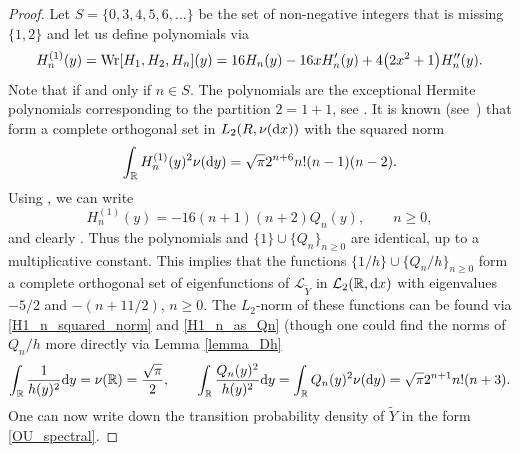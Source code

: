 \documentclass[pdftex]{sigma}
\numberwithin{equation}{section}
\theoremstyle{definition}
\def\L{{\mathcal L}}
\def\r{{\mathbb R}}
\def\wr{{\textnormal{Wr}}}
\def\d{{\textnormal d}}
\begin{document}
\begin{proof}
Let $S=\{0,3,4,5,6,\dots\}$ be the set of non-negative integers that is missing $\{1,2\}$ and let us define polynomials  via
\[
H^{(1)}_n(y)=\wr[H_1,H_2,H_n](y)=16 H_n(y)-16 x H_n'(y)+4 \bigl(2x^2+1\bigr) H_n''(y).
\]
Note that  if and only if $n\in S$.
The polynomials  are the exceptional Hermite polynomials corresponding to the partition $2=1+1$, see \cite[Definition 5.1]{Ullate_2014}. It is known (see~\cite[Propositions 5.7 and 5.8]{Ullate_2014}) that  form a complete orthogonal set in $L_2(R,\nu(\d x))$ with the squared norm
\begin{equation}\label{H1_n_squared_norm}
\int_{\r} H^{(1)}_n(y)^2 \nu(\d y)=\sqrt{\pi} 2^{n+6} n! (n-1)(n-2).
\end{equation}
Using \cite[Theorem 3.1]{Ullate_2018}, we can write
\begin{equation}\label{H1_n_as_Qn}
H^{(1)}_n(y)=-16 (n+1)(n+2) Q_n(y), \qquad n\ge 0,
\end{equation}
and clearly . Thus the polynomials  and $\{1\} \cup \{Q_n\}_{n \ge 0}$ are identical, up to a multiplicative constant. This implies that the functions $\{1/h\} \cup \{Q_n/h\}_{n \ge 0}$ form a complete orthogonal set of eigenfunctions of $\L_{\widetilde Y}$ in $\L_2(\r,\d x)$ with eigenvalues $-5/2$ and $-(n+11/2)$, $n\ge 0$. The $L_2$-norm of these functions can be found via \eqref{H1_n_squared_norm} and \eqref{H1_n_as_Qn} (though one could find the norms of $Q_n/h$ more directly via Lemma \ref{lemma_Dh}
\[
\int_{\r} \frac{1}{h(y)^2} \d y=\nu(\r)=\frac{\sqrt{\pi}}{2}, \qquad \int_{\r} \frac{Q_n(y)^2}{h(y)^2} \d y=
\int_{\r} Q_n(y)^2 \nu(\d y)=\sqrt{\pi} 2^{n+1} n! (n+3).
\]
One can now write down the transition probability density of $\widetilde Y$ in the form \eqref{OU_spectral}.
\end{proof}
\end{document}
